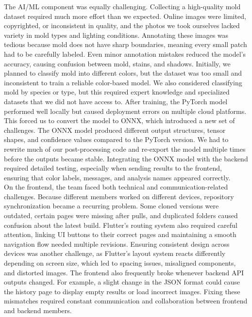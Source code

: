 \documentclass[conference]{IEEEtran}
\begin{document}
The AI/ML component was equally challenging. Collecting a high-quality mold dataset required much more effort than we expected. Online images were limited, copyrighted, or inconsistent in quality, and the photos we took ourselves lacked variety in mold types and lighting conditions. Annotating these images was tedious because mold does not have sharp boundaries, meaning every small patch had to be carefully labeled. Even minor annotation mistakes reduced the model’s accuracy, causing confusion between mold, stains, and shadows. Initially, we planned to classify mold into different colors, but the dataset was too small and inconsistent to train a reliable color-based model. We also considered classifying mold by species or type, but this required expert knowledge and specialized datasets that we did not have access to. After training, the PyTorch model performed well locally but caused deployment errors on multiple cloud platforms. This forced us to convert the model to ONNX, which introduced a new set of challenges. The ONNX model produced different output structures, tensor shapes, and confidence values compared to the PyTorch version. We had to rewrite much of our post-processing code and re-export the model multiple times before the outputs became stable. Integrating the ONNX model with the backend required detailed testing, especially when sending results to the frontend, ensuring that color labels, messages, and analysis names appeared correctly.\\

On the frontend, the team faced both technical and communication-related challenges. Because different members worked on different devices, repository synchronization became a recurring problem. Some cloned versions were outdated, certain pages were missing after pulls, and duplicated folders caused confusion about the latest build. Flutter’s routing system also required careful attention, linking UI buttons to their correct pages and maintaining a smooth navigation flow needed multiple revisions. Ensuring consistent design across devices was another challenge, as Flutter’s layout system reacts differently depending on screen size, which led to spacing issues, misaligned components, and distorted images. The frontend also frequently broke whenever backend API outputs changed. For example, a slight change in the JSON format could cause the history page to display empty results or load incorrect images. Fixing these mismatches required constant communication and collaboration between frontend and backend members.\\
\end{document}
